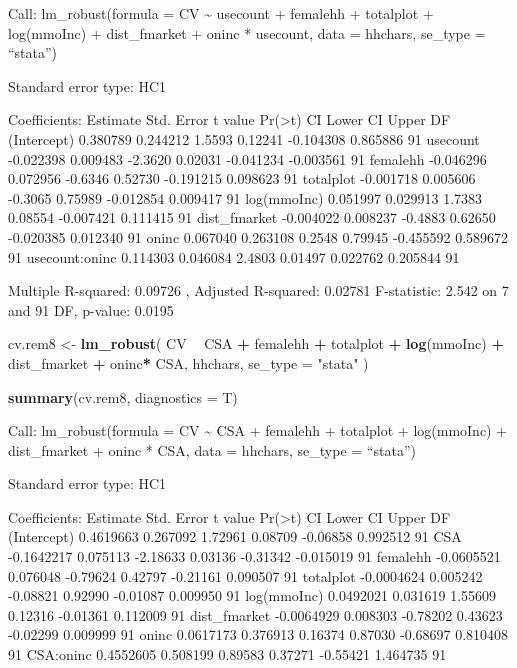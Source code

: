 \documentclass[
]{article}
\newenvironment{Shaded}{\begin{snugshade}}{\end{snugshade}}
\newcommand{\DataTypeTok}[1]{\textcolor[rgb]{0.13,0.29,0.53}{#1}}
\newcommand{\KeywordTok}[1]{\textcolor[rgb]{0.13,0.29,0.53}{\textbf{#1}}}
\newcommand{\NormalTok}[1]{#1}
\newcommand{\OperatorTok}[1]{\textcolor[rgb]{0.81,0.36,0.00}{\textbf{#1}}}
\newcommand{\StringTok}[1]{\textcolor[rgb]{0.31,0.60,0.02}{#1}}
\begin{document}
Call: lm\_robust(formula = CV \textasciitilde{} usecount + femalehh +
totalplot + log(mmoInc) + dist\_fmarket + oninc * usecount, data =
hhchars, se\_type = ``stata'')

Standard error type: HC1

Coefficients: Estimate Std. Error t value
Pr(\textgreater\textbar t\textbar) CI Lower CI Upper DF (Intercept)
0.380789 0.244212 1.5593 0.12241 -0.104308 0.865886 91 usecount
-0.022398 0.009483 -2.3620 0.02031 -0.041234 -0.003561 91 femalehh
-0.046296 0.072956 -0.6346 0.52730 -0.191215 0.098623 91 totalplot
-0.001718 0.005606 -0.3065 0.75989 -0.012854 0.009417 91 log(mmoInc)
0.051997 0.029913 1.7383 0.08554 -0.007421 0.111415 91 dist\_fmarket
-0.004022 0.008237 -0.4883 0.62650 -0.020385 0.012340 91 oninc 0.067040
0.263108 0.2548 0.79945 -0.455592 0.589672 91 usecount:oninc 0.114303
0.046084 2.4803 0.01497 0.022762 0.205844 91

Multiple R-squared: 0.09726 , Adjusted R-squared: 0.02781 F-statistic:
2.542 on 7 and 91 DF, p-value: 0.0195

\begin{Shaded}
\begin{Highlighting}[]
\NormalTok{cv.rem8 <-}
\StringTok{  }\KeywordTok{lm_robust}\NormalTok{(}
\NormalTok{    CV }\OperatorTok{~}\StringTok{ }\NormalTok{CSA }\OperatorTok{+}\StringTok{ }\NormalTok{femalehh  }\OperatorTok{+}\StringTok{ }\NormalTok{totalplot }\OperatorTok{+}\StringTok{ }\KeywordTok{log}\NormalTok{(mmoInc) }\OperatorTok{+}\StringTok{ }\NormalTok{dist_fmarket }\OperatorTok{+}\StringTok{ }\NormalTok{oninc}\OperatorTok{*}
\StringTok{      }\NormalTok{CSA,}
\NormalTok{    hhchars,}
    \DataTypeTok{se_type =} \StringTok{"stata"}
\NormalTok{  )}

\KeywordTok{summary}\NormalTok{(cv.rem8, }\DataTypeTok{diagnostics =}\NormalTok{ T)}
\end{Highlighting}
\end{Shaded}

Call: lm\_robust(formula = CV \textasciitilde{} CSA + femalehh +
totalplot + log(mmoInc) + dist\_fmarket + oninc * CSA, data = hhchars,
se\_type = ``stata'')

Standard error type: HC1

Coefficients: Estimate Std. Error t value
Pr(\textgreater\textbar t\textbar) CI Lower CI Upper DF (Intercept)
0.4619663 0.267092 1.72961 0.08709 -0.06858 0.992512 91 CSA -0.1642217
0.075113 -2.18633 0.03136 -0.31342 -0.015019 91 femalehh -0.0605521
0.076048 -0.79624 0.42797 -0.21161 0.090507 91 totalplot -0.0004624
0.005242 -0.08821 0.92990 -0.01087 0.009950 91 log(mmoInc) 0.0492021
0.031619 1.55609 0.12316 -0.01361 0.112009 91 dist\_fmarket -0.0064929
0.008303 -0.78202 0.43623 -0.02299 0.009999 91 oninc 0.0617173 0.376913
0.16374 0.87030 -0.68697 0.810408 91 CSA:oninc 0.4552605 0.508199
0.89583 0.37271 -0.55421 1.464735 91
\end{document}

